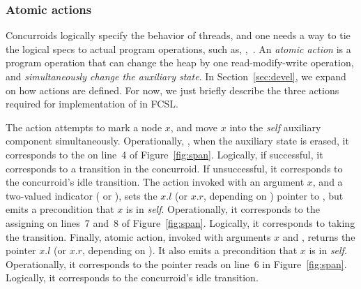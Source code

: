 


\subsubsection{Atomic actions}
\label{sec:trans-resp-acti}

Concurroids logically specify the behavior of threads, and one needs a
way to tie the logical specs to actual program operations, such as,
\eg,~.
% 
An \emph{atomic action} is a program operation that can change the
heap by one read-modify-write operation, and \emph{simultaneously
  change the auxiliary state}.  In Section~\ref{sec:devel}, we expand
on how actions are defined. %
For now, we just briefly describe the three actions required
for implementation of  in FCSL.

The  action attempts to mark a node $x$, and move $x$
into the \emph{self} auxiliary component
simultaneously. Operationally, \ie, when the auxiliary state is
erased, it corresponds to the  on line~4 of
Figure~\ref{fig:span}. Logically, if successful, it corresponds to
a  transition in the concurroid. If
unsuccessful, it corresponds to the concurroid's idle transition.
%
The  action invoked with an argument $x$, and a
two-valued indicator  ( or ), sets
the $x.l$ (or $x.r$, depending on ) pointer to ,
but emits a precondition that $x$ is in \emph{self}.  Operationally,
it corresponds to the assigning  on lines~7 and~8 of
Figure~\ref{fig:span}. Logically, it corresponds to taking the
 transition.
%
Finally,  atomic action, invoked with arguments $x$
and , returns the pointer $x.l$ (or $x.r$, depending on
). It also emits a precondition that $x$ is in
\emph{self}. Operationally, it corresponds to the pointer reads on
line~6 in Figure~\ref{fig:span}. Logically, it corresponds to the
concurroid's idle transition.

